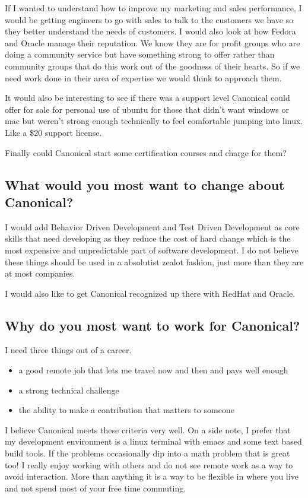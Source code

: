 \documentclass[letter,12pt]{article}
\begin{document}
If I wanted to understand how to improve my marketing and sales performance, I would be getting engineers to go with sales to talk to the customers we have so they better understand the needs of customers. I would also look at how Fedora and Oracle manage their reputation. We know they are for profit groups who are doing a community service but have something strong to offer rather than community groups that do this work out of the goodness of their hearts. So if we need work done in their area of expertise we would think to approach them.

It would also be interesting to see if there was a support level Canonical could offer for sale for personal use of ubuntu for those that didn't want windows or mac but weren't strong enough technically to feel comfortable jumping into linux. Like a \$20 support license.

Finally could Canonical start some certification courses and charge for them?

\subsection{What would you most want to change about Canonical?}
I would add Behavior Driven Development and Test Driven Development as core skills that need developing as they reduce the cost of hard change which is the most expensive and unpredictable part of software development. I do not believe these things should be used in a absolutist zealot fashion, just more than they are at most companies.

I would also like to get Canonical recognized up there with RedHat and Oracle.

\subsection{Why do you most want to work for Canonical?}
I need three things out of a career.
\begin{itemize}
\item a good remote job that lets me travel now and then and pays well enough
\item a strong technical challenge
\item the ability to make a contribution that matters to someone
\end{itemize}
I believe Canonical meets these criteria very well. On a side note, I prefer that my development environment is a linux terminal with emacs and some text based build tools. If the problems occasionally dip into a math problem that is great too! I really enjoy working with others and do not see remote work as a way to avoid interaction. More than anything it is a way to be flexible in where you live and not spend most of your free time commuting.
\end{document}
